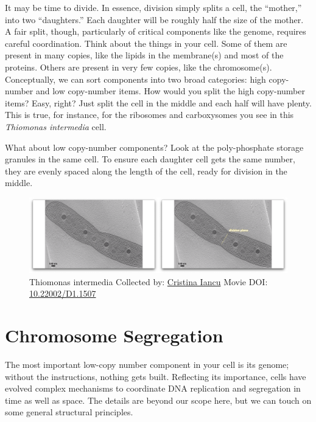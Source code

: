 \documentclass[]{tufte-book}
\begin{document}
It may be time to divide. In essence, division simply splits a cell, the
``mother,'' into two ``daughters.'' Each daughter will be roughly half
the size of the mother. A fair split, though, particularly of critical
components like the genome, requires careful coordination. Think about
the things in your cell. Some of them are present in many copies, like
the lipids in the membrane(s) and most of the proteins. Others are
present in very few copies, like the chromosome(s). Conceptually, we can
sort components into two broad categories: high copy-number and low
copy-number items. How would you split the high copy-number items? Easy,
right? Just split the cell in the middle and each half will have plenty.
This is true, for instance, for the ribosomes and carboxysomes you see
in this \emph{Thiomonas intermedia} cell.

What about low copy-number components? Look at the poly-phosphate
storage granules in the same cell. To ensure each daughter cell gets the
same number, they are evenly spaced along the length of the cell, ready
for division in the middle.





\begin{figure}
\includegraphics{movie_stills/5_1} \caption[Thiomonas intermedia Collected by:
\protect\hyperlink{cristina_iancu}{Cristina Iancu} Movie DOI:
\href{https://doi.org/10.22002/D1.1507}{10.22002/D1.1507}]{Thiomonas intermedia Collected by:
\protect\hyperlink{cristina_iancu}{Cristina Iancu} Movie DOI:
\href{https://doi.org/10.22002/D1.1507}{10.22002/D1.1507}}\label{fig:5-1}
\end{figure}

\section{Chromosome Segregation}\label{chromosome-segregation}

The most important low-copy number component in your cell is its genome;
without the instructions, nothing gets built. Reflecting its importance,
cells have evolved complex mechanisms to coordinate DNA replication and
segregation in time as well as space. The details are beyond our scope
here, but we can touch on some general structural principles.
\end{document}
